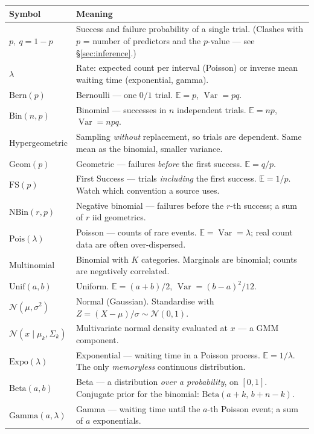 \documentclass[10pt,letterpaper,onecolumn]{article}
\makeatletter
\newenvironment{symtab}
  {\begin{longtable}{@{}>{\raggedright\arraybackslash}p{0.26\textwidth}%
                       >{\raggedright\arraybackslash}p{0.70\textwidth}@{}}
   \toprule
   \textbf{Symbol} & \textbf{Meaning} \\
   \midrule
   \endhead
   \bottomrule
   \endfoot}
  {\end{longtable}}
\makeatother
\begin{document}
\begin{symtab}
$p,\ q = 1-p$ & Success and failure probability of a single trial. (Clashes with $p$ = number of predictors and the $p$-value — see \S\ref{sec:inference}.) \\
$\lambda$ & Rate: expected count per interval (Poisson) or inverse mean waiting time (exponential, gamma). \\
$\mathrm{Bern}(p)$ & Bernoulli — one $0/1$ trial. $\mathbb{E}=p$, $\operatorname{Var}=pq$. \\
$\mathrm{Bin}(n,p)$ & Binomial — successes in $n$ independent trials. $\mathbb{E}=np$, $\operatorname{Var}=npq$. \\
Hypergeometric & Sampling \emph{without} replacement, so trials are dependent. Same mean as the binomial, smaller variance. \\
$\mathrm{Geom}(p)$ & Geometric — failures \emph{before} the first success. $\mathbb{E}=q/p$. \\
$\mathrm{FS}(p)$ & First Success — trials \emph{including} the first success. $\mathbb{E}=1/p$. Watch which convention a source uses. \\
$\mathrm{NBin}(r,p)$ & Negative binomial — failures before the $r$-th success; a sum of $r$ iid geometrics. \\
$\mathrm{Pois}(\lambda)$ & Poisson — counts of rare events. $\mathbb{E}=\operatorname{Var}=\lambda$; real count data are often over-dispersed. \\
Multinomial & Binomial with $K$ categories. Marginals are binomial; counts are negatively correlated. \\
$\mathrm{Unif}(a,b)$ & Uniform. $\mathbb{E}=(a+b)/2$, $\operatorname{Var}=(b-a)^2/12$. \\
$\mathcal{N}(\mu,\sigma^2)$ & Normal (Gaussian). Standardise with $Z=(X-\mu)/\sigma \sim \mathcal{N}(0,1)$. \\
$\mathcal{N}(x \mid \mu_k,\Sigma_k)$ & Multivariate normal density evaluated at $x$ — a GMM component. \\
$\mathrm{Expo}(\lambda)$ & Exponential — waiting time in a Poisson process. $\mathbb{E}=1/\lambda$. The only \emph{memoryless} continuous distribution. \\
$\mathrm{Beta}(a,b)$ & Beta — a distribution \emph{over a probability}, on $[0,1]$. Conjugate prior for the binomial: $\mathrm{Beta}(a+k,\,b+n-k)$. \\
$\mathrm{Gamma}(a,\lambda)$ & Gamma — waiting time until the $a$-th Poisson event; a sum of $a$ exponentials. \\

\end{symtab}
\end{document}
